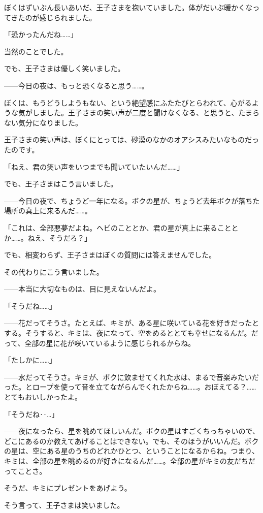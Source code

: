 ぼくはずいぶん長いあいだ、王子さまを抱いていました。体がだいぶ暖かくなってきたのが感じられました。

「恐かったんだね……」

当然のことでした。

でも、王子さまは優しく笑いました。

——今日の夜は、もっと恐くなると思う……。

ぼくは、もうどうしようもない、という絶望感にふたたびとらわれて、心がるような気がしました。王子さまの笑い声が二度と聞けなくなる、と思うと、たまらない気分になりました。

王子さまの笑い声は、ぼくにとっては、砂漠のなかのオアシスみたいなものだったのです。

「ねえ、君の笑い声をいつまでも聞いていたいんだ……」

でも、王子さまはこう言いました。

——今日の夜で、ちょうど一年になる。ボクの星が、ちょうど去年ボクが落ちた場所の真上に来るんだ……。

「これは、全部悪夢だよね。ヘビのこととか、君の星が真上に来ることとか……。ねえ、そうだろ？」

でも、相変わらず、王子さまはぼくの質問には答えませんでした。

その代わりにこう言いました。

——本当に大切なものは、目に見えないんだよ。

「そうだね……」

——花だってそうさ。たとえば、キミが、ある星に咲いている花を好きだったとする。そうすると、キミは、夜になって、空をめるととても幸せになるんだ。だって、全部の星に花が咲いているように感じられるからね。

「たしかに……」

——水だってそうさ。キミが、ボクに飲ませてくれた水は、まるで音楽みたいだった。とロープを使って音を立てながらんでくれたからね……。おぼえてる？……とてもおいしかったよ。

「そうだね‥…」

——夜になったら、星を眺めてほしいんだ。ボクの星はすごくちっちゃいので、どこにあるのか教えてあげることはできない。でも、そのほうがいいんだ。ボクの星は、空にある星のうちのどれかひとつ、ということになるからね。つまり、キミは、全部の星を眺めるのが好きになるんだ……。全部の星がキミの友だちだってことさ。


そうだ、キミにプレゼントをあげよう。

そう言って、王子さまは笑いました。

